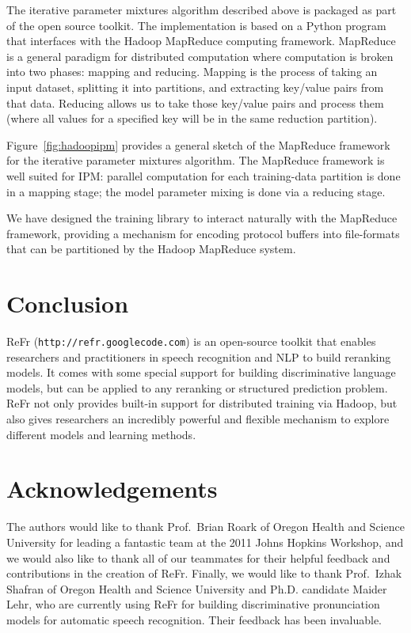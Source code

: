 \documentclass[a4paper]{article}
\begin{document}
The iterative parameter mixtures algorithm described above is packaged as part
of the open source toolkit.  The implementation is based on a Python program
that interfaces with the Hadoop MapReduce computing framework.
MapReduce is a general paradigm for distributed computation
\cite{dean08mapreduce} where computation is broken into two phases:
mapping and reducing.  Mapping is the process of taking an input dataset,
splitting it into partitions, and extracting key/value pairs from that data.
Reducing allows us to take those key/value pairs and process them (where all
values for a specified key will be in the same reduction partition).

Figure~\ref{fig:hadoopipm} provides a general sketch of the MapReduce framework
for the iterative parameter mixtures algorithm.
The MapReduce framework is well suited for IPM: parallel computation for each
training-data partition is done in a mapping stage; the model parameter mixing
is done via a reducing stage.

We have designed the training library to interact naturally with the
MapReduce framework, providing a mechanism for encoding protocol buffers
into file-formats that can be partitioned by the Hadoop MapReduce
system.

\section{Conclusion}
ReFr (\texttt{http://refr.googlecode.com}) is an open-source toolkit that enables researchers and practitioners in speech recognition and NLP to build reranking models.  It comes with some special support for building discriminative language models, but can be applied to any reranking or structured prediction problem.  ReFr not only provides built-in support for distributed training via Hadoop, but also gives researchers an incredibly powerful and flexible mechanism to explore different models and learning methods.

\section{Acknowledgements}
The authors would like to thank Prof.\ Brian Roark of Oregon Health and
Science University for leading a fantastic team at the 2011 Johns
Hopkins Workshop, and we would also like to thank all of our teammates
for their helpful feedback and contributions in the creation of
ReFr.  Finally, we would like to thank  Prof.~Izhak Shafran of Oregon Health and Science University and Ph.D. candidate Maider Lehr, who are currently using ReFr for building discriminative pronunciation models for automatic speech recognition.  Their feedback has been invaluable.

\newpage
%
\eightpt


\end{document}
